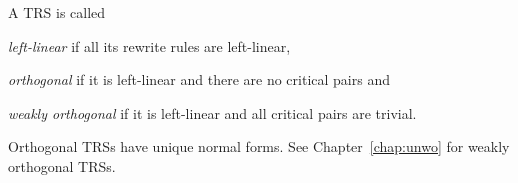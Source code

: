 \begin{definition}%
A TRS is called
\begin{compactenum}
  \item \emph{left-linear} if all its rewrite rules are left-linear,
  \item \emph{orthogonal} if it is left-linear and there are no critical pairs and
  \item \emph{weakly orthogonal} if it is left-linear and all critical pairs
    are trivial.
\end{compactenum}
\end{definition}

Orthogonal TRSs have unique normal forms. See Chapter~\ref{chap:unwo} for
weakly orthogonal TRSs.
